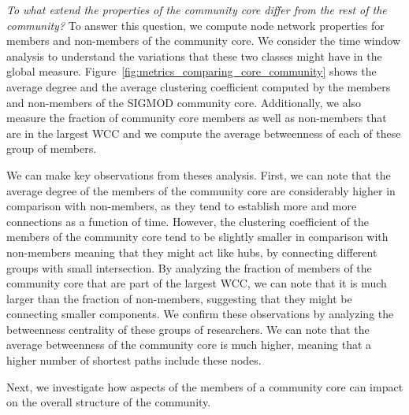 \textit{To what extend the properties of the community core differ from the rest of the community?}  To answer this question, we compute node network properties for members and non-members of the community
core. We consider the time window analysis to understand the variations that these two classes might have in the global measure.
Figure~\ref{fig:metrics_comparing_core_community} shows the average degree and the average clustering coefficient computed by the members and non-members of the SIGMOD 
community core. Additionally, we also measure the fraction of community core members as well as non-members that are in the largest WCC and we compute the average betweenness of
each of these group of members. 

We can make key observations
from theses analysis. First, we can note that the average degree of the members of the community core are considerably higher in comparison with non-members, as they tend to establish more and
more connections as a function of time. However, the clustering coefficient of the members of the community core tend to be slightly smaller in comparison with non-members meaning that they
might act like hubs, by connecting different groups with small intersection. By analyzing the fraction of members of the community core that are part of the largest
WCC, we can note that it is much larger than the fraction of non-members, suggesting that they might be connecting smaller components. 
We confirm these observations by analyzing the betweenness centrality of these groups of researchers. We can note that the average betweenness of the community core is much higher,
meaning that a higher number of shortest paths include these nodes. 

Next, we investigate how aspects of the members of a community core can impact on the overall structure of the community.


